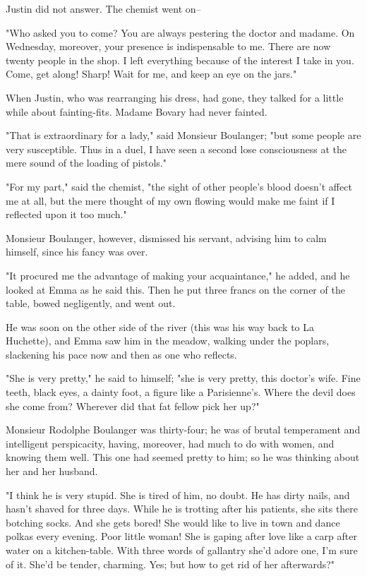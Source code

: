 \documentclass{tufte-book}
\begin{document}
Justin did not answer. The chemist went on--

"Who asked you to come? You are always pestering the doctor and madame.
On Wednesday, moreover, your presence is indispensable to me. There are
now twenty people in the shop. I left everything because of the interest
I take in you. Come, get along! Sharp! Wait for me, and keep an eye on
the jars."

When Justin, who was rearranging his dress, had gone, they talked for a
little while about fainting-fits. Madame Bovary had never fainted.

"That is extraordinary for a lady," said Monsieur Boulanger; "but some
people are very susceptible. Thus in a duel, I have seen a second lose
consciousness at the mere sound of the loading of pistols."

"For my part," said the chemist, "the sight of other people's blood
doesn't affect me at all, but the mere thought of my own flowing would
make me faint if I reflected upon it too much."

Monsieur Boulanger, however, dismissed his servant, advising him to calm
himself, since his fancy was over.

"It procured me the advantage of making your acquaintance," he added,
and he looked at Emma as he said this. Then he put three francs on the
corner of the table, bowed negligently, and went out.

He was soon on the other side of the river (this was his way back to La
Huchette), and Emma saw him in the meadow, walking under the poplars,
slackening his pace now and then as one who reflects.

"She is very pretty," he said to himself; "she is very pretty, this
doctor's wife. Fine teeth, black eyes, a dainty foot, a figure like a
Parisienne's. Where the devil does she come from? Wherever did that fat
fellow pick her up?"

Monsieur Rodolphe Boulanger was thirty-four; he was of brutal
temperament and intelligent perspicacity, having, moreover, had much to
do with women, and knowing them well. This one had seemed pretty to him;
so he was thinking about her and her husband.

"I think he is very stupid. She is tired of him, no doubt. He has dirty
nails, and hasn't shaved for three days. While he is trotting after his
patients, she sits there botching socks. And she gets bored! She would
like to live in town and dance polkas every evening. Poor little woman!
She is gaping after love like a carp after water on a kitchen-table.
With three words of gallantry she'd adore one, I'm sure of it. She'd be
tender, charming. Yes; but how to get rid of her afterwards?"
\end{document}
